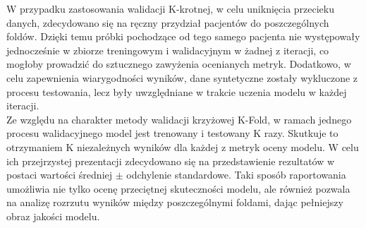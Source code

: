 \documentclass[a4paper,twoside,12pt]{book}
\begin{document}
W przypadku zastosowania walidacji K-krotnej, w celu uniknięcia przecieku danych, zdecydowano się na ręczny przydział pacjentów do poszczególnych foldów. Dzięki temu próbki pochodzące od tego samego pacjenta nie występowały jednocześnie w zbiorze treningowym i walidacyjnym w żadnej z iteracji, co mogłoby prowadzić do sztucznego zawyżenia ocenianych metryk. Dodatkowo, w celu zapewnienia wiarygodności wyników, dane syntetyczne zostały wykluczone z procesu testowania, lecz były uwzględniane w trakcie uczenia modelu w każdej iteracji.\\

Ze względu na charakter metody walidacji krzyżowej K-Fold, w ramach jednego procesu walidacyjnego model jest  trenowany i testowany K razy. Skutkuje to otrzymaniem K niezależnych wyników dla każdej z metryk oceny modelu. W celu ich przejrzystej prezentacji zdecydowano się na przedstawienie rezultatów w postaci wartości średniej $\pm$ odchylenie standardowe. Taki sposób raportowania umożliwia nie tylko ocenę przeciętnej skuteczności modelu, ale również pozwala na analizę rozrzutu wyników między poszczególnymi foldami, dając pełniejszy obraz jakości modelu.


\newpage
\end{document}

